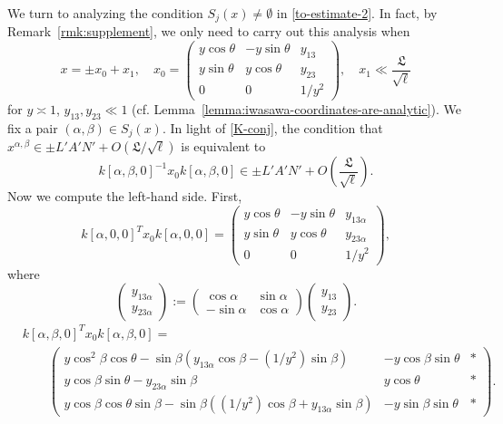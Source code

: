 \documentclass[11pt,oneside]{amsart}
\numberwithin{equation}{section}
\theoremstyle{remark}
\theoremstyle{plain}
\begin{document}
We turn to analyzing the condition $S_j(x)\neq\emptyset$ in \eqref{to-estimate-2}. In fact, by Remark~\ref{rmk:supplement}, we only need to carry out this analysis when
\begin{equation}
\label{K-conj}
x=\pm x_0+x_1,\quad x_0=\begin{pmatrix} y\cos\theta&-y\sin\theta&y_{13}\\y\sin\theta&y\cos\theta&y_{23}\\0&0&1/y^2\end{pmatrix},\quad x_1\ll \frac{\mathfrak{L}}{\sqrt{\ell}}
\end{equation}
for $y\asymp 1$, $y_{13},y_{23}\ll 1$ (cf. Lemma~\ref{lemma:iwasawa-coordinates-are-analytic}).
We fix a pair $(\alpha,\beta)\in S_j(x)$. In light of \eqref{K-conj}, the condition that $x^{\alpha,\beta}\in \pm L'A'N'+O(\mathfrak{L}/\sqrt{\ell})$ is equivalent to
\begin{equation}\label{eq:x0conjugate}
k[\alpha,\beta,0]^{-1}x_0k[\alpha,\beta,0]\in \pm L'A'N'+O\left(\frac{\mathfrak{L}}{\sqrt{\ell}}\right).
\end{equation}
Now we compute the left-hand side. First,
\[ k[\alpha,0,0]^Tx_0k[\alpha,0,0]=\begin{pmatrix} y\cos\theta&-y\sin\theta&y_{13\alpha}\\y\sin\theta&y\cos\theta&y_{23\alpha}\\0&0&1/y^2\end{pmatrix}, \]
where
\begin{equation}
\label{y-alpha}
\begin{pmatrix}y_{13\alpha}\\y_{23\alpha}\end{pmatrix}:=\begin{pmatrix}\cos\alpha&\sin\alpha\\-\sin\alpha&\cos\alpha\end{pmatrix}\begin{pmatrix}y_{13}\\y_{23}\end{pmatrix}.
\end{equation}
\begin{equation}
\label{conjugate-expanded}
\begin{aligned}
&k[\alpha,\beta,0]^Tx_0k[\alpha,\beta,0]=\\
&\qquad\begin{pmatrix} y\cos^2\beta\cos\theta-\sin\beta(y_{13\alpha}\cos\beta-(1/y^2)\sin\beta)&-y\cos\beta\sin\theta&\ast\\ y\cos\beta\sin\theta - y_{23\alpha}\sin\beta&y\cos\theta&\ast\\y\cos\beta\cos\theta\sin\beta-\sin\beta((1/y^2)\cos\beta+y_{13\alpha}\sin\beta)&-y\sin\beta\sin\theta&\ast\end{pmatrix}.
\end{aligned}
\end{equation}
\end{document}
